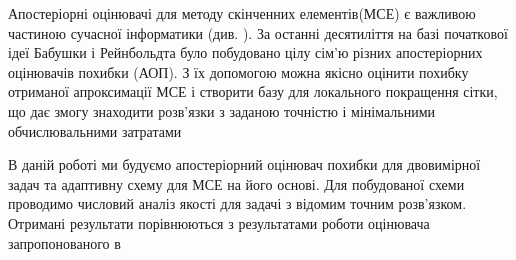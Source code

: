 

Апостеріорні оцінювачі для методу скінченних елементів(МСЕ) є важливою частиною сучасної інформатики (див. \cite{verfurth1996review, verfurth1994posteriori,eriksson1995introduction,ainsworth2011posteriori}). За останні десятиліття на базі початкової ідеї Бабушки і Рейнбольдта \cite{babuvska1978posteriori} було побудовано цілу сім'ю різних апостеріорних оцінювачів похибки (АОП). З їх допомогою можна якісно оцінити похибку отриманої апроксимації МСЕ і створити базу для локального покращення сітки, що дає змогу знаходити розв'язки з заданою точністю і мінімальними обчислювальними затратами \cite{babuska2011finite}

В даній роботі ми будуємо апостеріорний оцінювач похибки для двовимірної задач та адаптивну схему для МСЕ на його основі. Для побудованої схеми проводимо числовий аналіз якості для задачі з відомим точним розв'язком.
Отримані результати порівнюються з результатами роботи оцінювача запропонованого в \cite{OstShynAee11}


